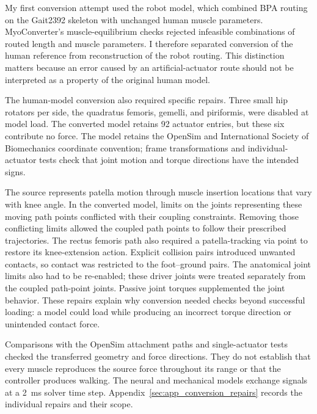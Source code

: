 My first conversion attempt used the robot model, which combined BPA routing on the Gait2392 skeleton with unchanged human muscle parameters. MyoConverter's muscle-equilibrium checks rejected infeasible combinations of routed length and muscle parameters. I therefore separated conversion of the human reference from reconstruction of the robot routing. This distinction matters because an error caused by an artificial-actuator route should not be interpreted as a property of the original human model.

The human-model conversion also required specific repairs. Three small hip rotators per side, the quadratus femoris, gemelli, and piriformis, were disabled at model load. The converted model retains 92 actuator entries, but these six contribute no force. The model retains the OpenSim and International Society of Biomechanics coordinate convention; frame transformations and individual-actuator tests check that joint motion and torque directions have the intended signs.

The source represents patella motion through muscle insertion locations that vary with knee angle. In the converted model, limits on the joints representing these moving path points conflicted with their coupling constraints. Removing those conflicting limits allowed the coupled path points to follow their prescribed trajectories. The rectus femoris path also required a patella-tracking via point to restore its knee-extension action. Explicit collision pairs introduced unwanted contacts, so contact was restricted to the foot--ground pairs. The anatomical joint limits also had to be re-enabled; these driver joints were treated separately from the coupled path-point joints. Passive joint torques supplemented the joint behavior. These repairs explain why conversion needed checks beyond successful loading: a model could load while producing an incorrect torque direction or unintended contact force.

Comparisons with the OpenSim attachment paths and single-actuator tests checked the transferred geometry and force directions. They do not establish that every muscle reproduces the source force throughout its range or that the controller produces walking. The neural and mechanical models exchange signals at a \qty{2}{\milli\second} solver time step. Appendix~\ref{sec:app_conversion_repairs} records the individual repairs and their scope.

